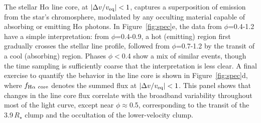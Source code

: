 \documentclass{nature3}
\begin{document}
The stellar H$\alpha$ line core, at $|\Delta v / v_{\rm
eq}|<1$, captures a superposition of emission from the star's
chromosphere, modulated by any occulting material capable of absorbing
or emitting H$\alpha$ photons.  In Figure~\ref{fig:spec}e, the data
from $\phi$=0.4-1.2 have a simple interpretation: from $\phi$=0.4-0.9,
a hot (emitting) region first gradually crosses the stellar line
profile, followed from $\phi$=0.7-1.2 by the transit of a cool
(absorbing) region. Phases $\phi$$<$0.4 show a mix of similar events,
though the time sampling is sufficiently coarse that the
interpretation is less clear.  A final exercise to quantify the
behavior in the line core is shown in Figure~\ref{fig:spec}d, where
$f_{\rm H\alpha\ core}$ denotes the summed flux at $|\Delta v / v_{\rm
eq}|<1$.  This panel shows that changes in the line core flux 
correlate with the broadband variability throughout most of the light
curve, except near $\phi$$\approx$0.5, corresponding to the transit of the
3.9\,$R_\star$ clump and the occultation of the lower-velocity clump.
\end{document}
